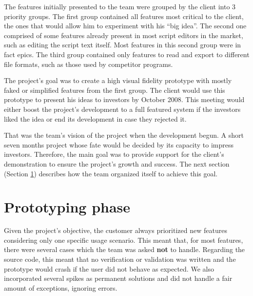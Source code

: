 \documentclass[lnbip]{svmultln}
\begin{document}

The features initially presented to the team were grouped by the
client into 3 priority groups. The first group contained all features
most critical to the client, the ones that would allow him to
experiment with his ``big idea''. The second one comprised of some
features already present in most script editors in the market, such as
editing the script text itself. Most features in this second group
were in fact epics. The third group contained only features to read
and export to different file formats, such as those used by competitor
programs.

The project's goal was to create a high visual fidelity prototype with
mostly faked or simplified features from the first group. The client
would use this prototype to present his ideas to investors by October
2008. This meeting would either boost the project's development to a
full featured system if the investors liked the idea or end its
development in case they rejected it.

That was the team's vision of the project when the development
begun. A short seven months project whose fate would be decided by its
capacity to impress investors. Therefore, the main goal was to provide
support for the client's demonstration to ensure the project's growth
and success. The next section (Section \ref{sec:working}) describes
how the team organized itself to achieve this goal.

\section{Prototyping phase}
\label{sec:working}

Given the project's objective, the customer always prioritized new
features considering only one specific usage scenario. This meant
that, for most features, there were several cases which the team was
asked \textbf{not} to handle. Regarding the source code, this meant
that no verification or validation was written and the prototype would
crash if the user did not behave as expected. We also incorporated
several spikes as permanent solutions and did not handle a fair amount
of exceptions, ignoring errors.
\end{document}
